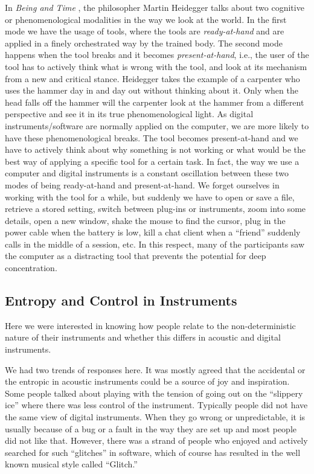 In \textit{Being and Time} \cite{Heidegger:1995}, the philosopher Martin
Heidegger talks about two cognitive or phenomenological modalities in the way we
look at the world. In the first mode we have the usage of tools, where the tools
are \textit{ready-at-hand} and are applied in a finely orchestrated way by the
trained body. The second mode happens when the tool breaks and it becomes
\textit{present-at-hand}, i.e., the user of the tool has to actively think what
is wrong with the tool, and look at its mechanism from a new and critical stance.
Heidegger takes the example of a carpenter who uses the hammer day in and day out
without thinking about it. Only when the head falls off the hammer will the
carpenter look at the hammer from a different perspective and see it in its true
phenomenological light. As digital instruments/software are normally applied on
the computer, we are more likely to have these phenomenological breaks. The tool
becomes present-at-hand and we have to actively think about why something is not
working or what would be the best way of applying a specific tool for a certain
task. In fact, the way we use a computer and digital instruments is a constant
oscillation between these two modes of being ready-at-hand and present-at-hand.
We forget ourselves in working with the tool for a while, but suddenly we have to
open or save a file, retrieve a stored setting, switch between plug-ins or
instruments, zoom into some details, open a new window, shake the mouse to find
the cursor, plug in the power cable when the battery is low, kill a chat client
when a ``friend'' suddenly calls in the middle of a session, etc. In this
respect, many of the participants saw the computer as a distracting tool that
prevents the potential for deep concentration.

\subsection{Entropy and Control in Instruments}
Here we were interested in knowing how people relate to the non-deterministic
nature of their instruments and whether this differs in acoustic and digital
instruments.

We had two trends of responses here. It was mostly agreed that the accidental or
the entropic in acoustic instruments could be a source of joy and inspiration.
Some people talked about playing with the tension of going out on the ``slippery
ice'' where there was less control of the instrument. Typically people did not
have the same view of digital instruments. When they go wrong or unpredictable,
it is usually because of a bug or a fault in the way they are set up and most
people did not like that. However, there was a strand of people who enjoyed and
actively searched for such ``glitches'' in software, which of course has resulted
in the well known musical style called ``Glitch.''

